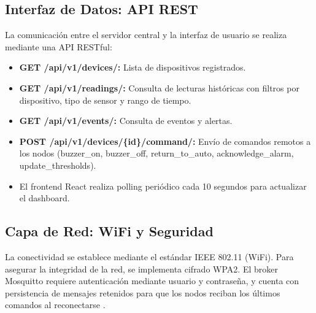 \subsection{Interfaz de Datos: API REST}
La comunicación entre el servidor central y la interfaz de usuario se realiza mediante una API RESTful:
\begin{itemize}
    \item \textbf{GET /api/v1/devices/:} Lista de dispositivos registrados.
    \item \textbf{GET /api/v1/readings/:} Consulta de lecturas históricas con filtros por dispositivo, tipo de sensor y rango de tiempo.
    \item \textbf{GET /api/v1/events/:} Consulta de eventos y alertas.
    \item \textbf{POST /api/v1/devices/\{id\}/command/:} Envío de comandos remotos a los nodos (buzzer\_on, buzzer\_off, return\_to\_auto, acknowledge\_alarm, update\_thresholds).
    \item El frontend React realiza polling peri\'odico cada 10 segundos para actualizar el dashboard.
\end{itemize}

\subsection{Capa de Red: WiFi y Seguridad}
La conectividad se establece mediante el estándar IEEE 802.11 (WiFi). Para asegurar la integridad de la red, se implementa cifrado WPA2. El broker Mosquitto requiere autenticación mediante usuario y contraseña, y cuenta con persistencia de mensajes retenidos para que los nodos reciban los últimos comandos al reconectarse \citep{valvano2014volume1}.

